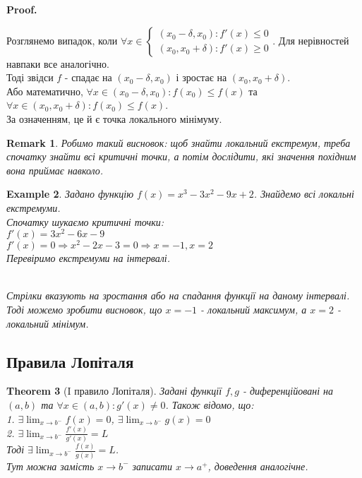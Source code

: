 \documentclass[a4paper, 14pt]{article}
\makeatletter
\def\huge{\displaystyle}
\def\qed{$\blacksquare$}
\theoremstyle{theoremdd}
\newtheorem{theorem}{Theorem}[subsection]
\theoremstyle{theoremdd}
\theoremstyle{theoremdd}
\theoremstyle{theoremdd}
\newtheorem{example}[theorem]{Example}
\theoremstyle{theoremdd}
\theoremstyle{theoremdd}
\newtheorem{remark}[theorem]{Remark}
\theoremstyle{theoremdd}
\theoremstyle{theoremdd}
\renewenvironment{proof}[1][Proof.\\]{\par
\pushQED{\hfill \qed}%
\normalfont \topsep6\p@\@plus6\p@\relax
\trivlist
\item\relax
{\bfseries
#1\@addpunct{.}}\hspace\labelsep\ignorespaces
}{%
\popQED\endtrivlist\@endpefalse
}
\makeatother
\begin{document}
\begin{proof}
Розглянемо випадок, коли $\forall x \in \begin{cases} (x_0-\delta,x_0): f'(x) \leq 0 \\ (x_0,x_0+\delta): f'(x) \geq 0 \end{cases}$. Для нерівностей навпаки все аналогічно.\\
Тоді звідси $f$ - спадає на $(x_0 - \delta, x_0)$ і зростає на $(x_0, x_0 + \delta)$.\\
Або математично, $\forall x \in (x_0-\delta, x_0): f(x_0) \leq f(x)$ та $\forall x \in (x_0, x_0+\delta): f(x_0) \leq f(x)$.\\
За означенням, це й є точка локального мінімуму.
\end{proof}

\begin{remark}
Робимо такий висновок: щоб знайти локальний екстремум, треба спочатку знайти всі критичні точки, а потім дослідити, які значення похідним вона приймає навколо.
\end{remark}

\begin{example}
Задано функцію $f(x) = x^3-3x^2-9x+2$. Знайдемо всі локальні екстремуми.\\
Спочатку шукаємо критичні точки:\\
$f'(x) = 3x^2-6x-9$\\
$f'(x) = 0 \Rightarrow x^2-2x-3 = 0 \Rightarrow x = -1,x = 2$\\
Перевіримо екстремуми на інтервалі.
\bigskip \\
\\
Стрілки вказують на зростання або на спадання функції на даному інтервалі. Тоді можемо зробити висновок, що $x=-1$ - локальний максимум, а $x=2$ - локальний мінімум.
\end{example}

\subsection{Правила Лопіталя}
\begin{theorem}[I правило Лопіталя]
Задані функції $f,g$ - диференційовані на $(a,b)$ та $\forall x \in (a,b): g'(x) \neq 0$. Також відомо, що:\\
1. $\exists \huge \lim_{x \to b^-} f(x) = 0$, $\exists \huge \lim_{x \to b^-} g(x) = 0$\\
2. $\exists \huge \lim_{x \to b^-} \frac{f'(x)}{g'(x)} = L$\\
Тоді $\exists \huge \lim_{x \to b^-} \frac{f(x)}{g(x)} = L$.\\
\textit{Тут можна замість $x \to b^-$ записати $x \to a^+$, доведення аналогічне.}
\end{theorem}
\end{document}
